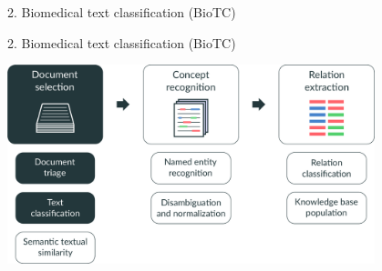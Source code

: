 \renewcommand{\CurrentProgressBarIs}{\TwoOfFive}
\begingroup
\begin{frame}[t,plain]{2. Biomedical text classification (BioTC)}
\end{frame}
\endgroup
\begingroup
{}
\begin{frame}[t]{2. Biomedical text classification (BioTC)}

\centering
\includegraphics[width=0.80\textwidth]{img/biomedical-information-extraction/v3/011.pdf}%

\end{frame}
\endgroup
